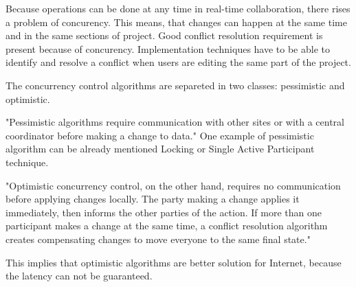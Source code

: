 \documentclass[12pt,oneside]{fithesis2}
\begin{document}
\par Because operations can be done at any time in real-time collaboration, there rises a problem of concurency. This means, that changes can happen at the same time and in the same sections of project. Good conflict resolution requirement is present because of concurency. Implementation techniques have to be able to identify and resolve a conflict when users are editing the same part of the project. \par The concurrency control algorithms are separeted in two classes: pessimistic and optimistic. \par "Pessimistic algorithms require communication with other sites or with a central coordinator before making a change to data." \cite{Jupiter} One example of pessimistic algorithm can be already mentioned Locking or Single Active Participant technique. \par "Optimistic concurrency control, on the other hand, requires no communication before applying changes locally. The party making a change applies it immediately, then informs the other parties of the action. If more than one participant makes a change at the same time, a conflict resolution algorithm creates compensating changes to move everyone to the same final state." \cite{Jupiter} \par This implies that optimistic algorithms are better solution for Internet, because the latency can not be guaranteed. 
\end{document}
